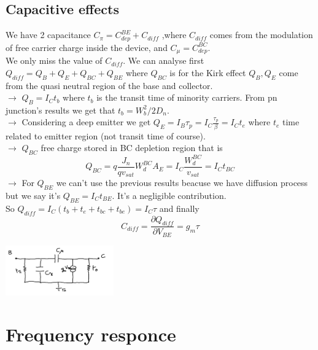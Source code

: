\subsection{Capacitive effects}
We have 2 capacitance $C_\pi=C_{dep}^{BE}+C_{diff}$ ,where $C_{diff}$ comes from the modulation of free carrier charge inside the device, and $C_\mu=C_{dep}^{BC}$.\\
We only miss the value of $C_{diff}$. We can analyse first $Q_{diff}=Q_B+Q_E+Q_{BC}+Q_{BE}$ where $Q_{BC}$ is for the Kirk effect $Q_B,Q_E$ come from the quasi neutral region of the base and collector.\\
\vspace{5mm}
$\rightarrow$ $Q_B=I_Ct_b$ where $t_b$ is the transit time of minority carriers. From pn junction's results we get that $t_b=W_b^2/2D_n$.\\
\vspace{2mm}
$\rightarrow$ Considering a deep emitter we get $Q_E=I_B\tau_p=I_C \frac{\tau_p}{\beta}=I_Ct_e$ where $t_e$ time related to emitter region (not transit time of course). \\
\vspace{2mm}
$\rightarrow$ $Q_{BC}$ free charge stored in BC depletion region that is
\begin{equation}
Q_{BC}=q \frac{J_n}{qv_{sat}}W_d^{BC}A_E=I_C \frac{W_d^{BC}}{v_{sat}}=I_C t_{BC}
\end{equation}
$\rightarrow$ For $Q_{BE}$ we can't use the previous results beacuse we have diffusion process but we say it's $Q_{BE}=I_Ct_{BE}$. It's a negligible contribution.\\
\vspace{5mm}
So $Q_{diff}=I_C(t_b+t_e+t_{bc}+t_{be})=I_C \tau$ and finally
\begin{equation}
C_{diff}=\frac{\partial Q_{diff}}{\partial V_{BE}}=g_m\tau
\end{equation}

\centering
\includegraphics[width=0.35\textwidth]{bjt13.png}\\
\raggedright


\section{Frequency responce}

